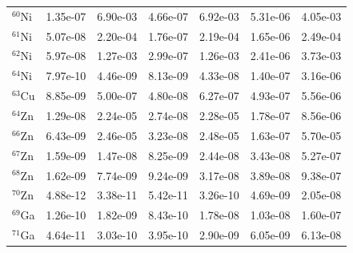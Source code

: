 \begin{table}
\begin{tabular}{l|cc|cc|cc}
$^{60}$Ni & 1.35e-07 & 6.90e-03 & 4.66e-07 & 6.92e-03 & 5.31e-06 & 4.05e-03\\
$^{61}$Ni & 5.07e-08 & 2.20e-04 & 1.76e-07 & 2.19e-04 & 1.65e-06 & 2.49e-04\\
$^{62}$Ni & 5.97e-08 & 1.27e-03 & 2.99e-07 & 1.26e-03 & 2.41e-06 & 3.73e-03\\
$^{64}$Ni & 7.97e-10 & 4.46e-09 & 8.13e-09 & 4.33e-08 & 1.40e-07 & 3.16e-06\\
$^{63}$Cu & 8.85e-09 & 5.00e-07 & 4.80e-08 & 6.27e-07 & 4.93e-07 & 5.56e-06\\
$^{64}$Zn & 1.29e-08 & 2.24e-05 & 2.74e-08 & 2.28e-05 & 1.78e-07 & 8.56e-06\\
$^{66}$Zn & 6.43e-09 & 2.46e-05 & 3.23e-08 & 2.48e-05 & 1.63e-07 & 5.70e-05\\
$^{67}$Zn & 1.59e-09 & 1.47e-08 & 8.25e-09 & 2.44e-08 & 3.43e-08 & 5.27e-07\\
$^{68}$Zn & 1.62e-09 & 7.74e-09 & 9.24e-09 & 3.17e-08 & 3.89e-08 & 9.38e-07\\
$^{70}$Zn & 4.88e-12 & 3.38e-11 & 5.42e-11 & 3.26e-10 & 4.69e-09 & 2.05e-08\\
$^{69}$Ga & 1.26e-10 & 1.82e-09 & 8.43e-10 & 1.78e-08 & 1.03e-08 & 1.60e-07\\
$^{71}$Ga & 4.64e-11 & 3.03e-10 & 3.95e-10 & 2.90e-09 & 6.05e-09 & 6.13e-08\\
\hline
\end{tabular}
\end{table}
\newpage


